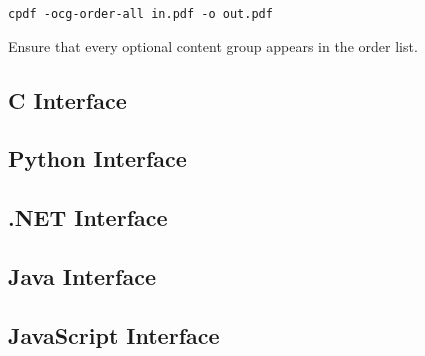 \documentclass{book}
\begin{document}
  {\small\begin{framed}
  \noindent\verb!cpdf -ocg-order-all in.pdf -o out.pdf!
  \end{framed}}

\noindent Ensure that every optional content group appears in the order list.

\begin{cpdflib}
\clearpage
\section*{C Interface}
\begin{small}\tt

\end{small}
\end{cpdflib}

\begin{pycpdflib}
\clearpage
\section*{Python Interface}
\begin{small}\tt

\end{small}
\end{pycpdflib}

\begin{dotnetcpdflib}
\clearpage
\section*{.NET Interface}
\begin{small}\tt

\end{small}
\end{dotnetcpdflib}

\begin{jcpdflib}
\clearpage
\section*{Java Interface}
\begin{small}\tt

\end{small}
\end{jcpdflib}

\begin{jscpdflib}
\clearpage
\section*{JavaScript Interface}
\begin{small}\tt

\end{small}
\end{jscpdflib}
\end{document}
